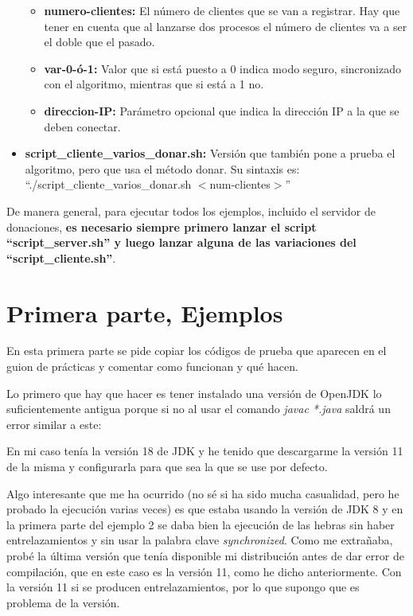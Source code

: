 \documentclass{article}
\begin{document}
\begin{itemize}
    \begin{itemize}
        \item \textbf{numero-clientes: }El número de clientes que se van a registrar. Hay que tener en cuenta que al lanzarse dos procesos el número de clientes va a ser el doble que el pasado.
        \item \textbf{var-0-ó-1: }Valor que si está puesto a 0 indica modo seguro, sincronizado con el algoritmo, mientras que si está a 1 no.
        \item \textbf{direccion-IP: }Parámetro opcional que indica la dirección IP a la que se deben conectar.
    \end{itemize}

    \item \textbf{script\_cliente\_varios\_donar.sh: }Versión que también pone a prueba el algoritmo, pero que usa el método donar. Su sintaxis es: ``./script\_cliente\_varios\_donar.sh $<$num-clientes$>$''
\end{itemize}


De manera general, para ejecutar todos los ejemplos, incluido el servidor de donaciones, \textbf{es necesario siempre primero lanzar el script ``script\_server.sh'' y luego lanzar alguna de las variaciones del ``script\_cliente.sh''}.



\section{Primera parte, Ejemplos}
En esta primera parte se pide copiar los códigos de prueba que aparecen en el guion de prácticas y comentar como funcionan y qué hacen.

\bigskip

Lo primero que hay que hacer es tener instalado una versión de OpenJDK lo suficientemente antigua porque si no al usar el comando \textit{javac *.java} saldrá un error similar a este:


En mi caso tenía la versión 18 de JDK y he tenido que descargarme la versión 11 de la misma y configurarla para que sea la que se use por defecto.

\bigskip

Algo interesante que me ha ocurrido (no sé si ha sido mucha casualidad, pero he probado la ejecución varias veces) es que estaba usando la versión de JDK 8 y en la primera parte del ejemplo 2 se daba bien la ejecución de las hebras sin haber entrelazamientos y sin usar la palabra clave \textit{synchronized}. Como me extrañaba, probé la última versión que tenía disponible mi distribución antes de dar error de compilación, que en este caso es la versión 11, como he dicho anteriormente. Con la versión 11 si se producen entrelazamientos, por lo que supongo que es problema de la versión.
\end{document}
